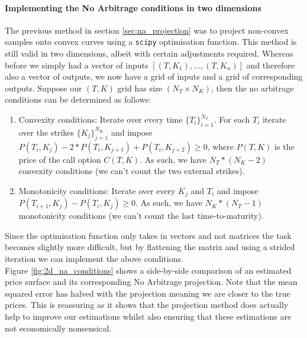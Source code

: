 \documentclass[a4paper,12pt]{article}
\begin{document}
\paragraph{Implementing the No Arbitrage conditions in two dimensions}
The previous method in section \ref{sec:na_projection} was to project non-convex samples onto convex curves using a \texttt{scipy} optimisation function. This method is still valid in two dimensions, albeit with certain adjustments required. Whereas before we simply had a vector of inputs $[(T,K_1), ..., (T,K_n)]$ and therefore also a vector of outputs, we now have a grid of inputs and a grid of corresponding outputs. Suppose our $(T, K)$ grid has size $(N_T \times N_K)$, then the no arbitrage conditions can be determined as follows:\\
\begin{enumerate}
    \item Convexity conditions: Iterate over every time $\{T_i\}_{i=1}^{N_T}$. For each $T_i$ iterate over the strikes $\{K_j\}_{j=1}^{N_K}$ and impose $P(T_i, K_j) - 2*P(T_i, K_{j+1}) + P(T_i, K_{j+2}) \geq 0$, where $P(T, K)$ is the price of the call option $C(T, K)$. As such, we have $N_T*(N_K-2)$ convexity conditions (we can't count the two external strikes). 
    \item Monotonicity conditions: Iterate over every $K_j$ and $T_i$ and impose $P(T_{i+1}, K_j) - P(T_i, K_j) \geq 0$. As such, we have $N_K*(N_T-1)$ monotonicity conditions (we can't count the last time-to-maturity).
\end{enumerate}
Since the optimisation function only takes in vectors and not matrices the task becomes slightly more difficult, but by flattening the matrix and using a strided iteration we can implement the above conditions.\\
Figure \ref{fig:2d_na_conditions} shows a side-by-side comparison of an estimated price surface and its corresponding No Arbitrage projection. Note that the mean squared error has halved with the projection meaning we are closer to the true prices. This is reassuring as it shows that the projection method does actually help to improve our estimations whilst also ensuring that these estimations are not economically nonsensical.
\end{document}
